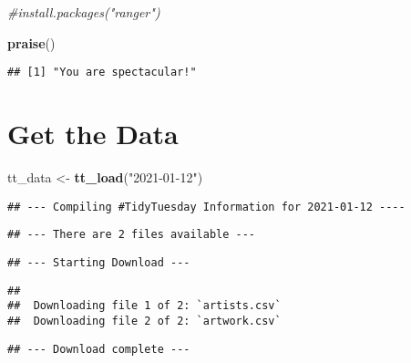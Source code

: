 \documentclass[]{article}
\newenvironment{Shaded}{\begin{snugshade}}{\end{snugshade}}
\newcommand{\CommentTok}[1]{\textcolor[rgb]{0.56,0.35,0.01}{\textit{#1}}}
\newcommand{\KeywordTok}[1]{\textcolor[rgb]{0.13,0.29,0.53}{\textbf{#1}}}
\newcommand{\NormalTok}[1]{#1}
\newcommand{\OperatorTok}[1]{\textcolor[rgb]{0.81,0.36,0.00}{\textbf{#1}}}
\newcommand{\StringTok}[1]{\textcolor[rgb]{0.31,0.60,0.02}{#1}}
\begin{document}
\begin{Shaded}
\begin{Highlighting}[]
\CommentTok{#install.packages("ranger")}
\end{Highlighting}
\end{Shaded}

\begin{Shaded}
\begin{Highlighting}[]
\KeywordTok{praise}\NormalTok{()}
\end{Highlighting}
\end{Shaded}

\begin{verbatim}
## [1] "You are spectacular!"
\end{verbatim}

\hypertarget{get-the-data}{%
\section{Get the Data}\label{get-the-data}}

\begin{Shaded}
\begin{Highlighting}[]
\NormalTok{tt_data <-}\StringTok{ }\KeywordTok{tt_load}\NormalTok{(}\StringTok{"2021-01-12"}\NormalTok{)}
\end{Highlighting}
\end{Shaded}

\begin{verbatim}
## --- Compiling #TidyTuesday Information for 2021-01-12 ----
\end{verbatim}

\begin{verbatim}
## --- There are 2 files available ---
\end{verbatim}

\begin{verbatim}
## --- Starting Download ---
\end{verbatim}

\begin{verbatim}
## 
##  Downloading file 1 of 2: `artists.csv`
##  Downloading file 2 of 2: `artwork.csv`
\end{verbatim}

\begin{verbatim}
## --- Download complete ---
\end{verbatim}

\begin{Shaded}
\end{Shaded}
\end{document}

